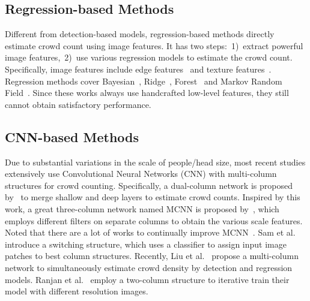 \documentclass[sigconf]{acmart}
\newcommand{\ljx}[1]{\textcolor{black}{#1}}
\begin{document}
\vspace{-2mm}
\subsection{Regression-based Methods}
Different from detection-based models, regression-based methods directly estimate crowd count using image features.
It has two steps:~1)~extract powerful image features,~2)~use various regression models to estimate the crowd count.
Specifically, image features include edge features~\cite{r-edge-count-bayesian-12,r-edege-text-structure-count-12,r-count-edeger-crossing-Line-13,r-edge-count-96,r-density-edge-09} and texture features~\cite{r-count-13,r-edege-text-structure-count-12,r-mrf-count-multi-source-13,r-forest-density-15}. 
Regression methods cover Bayesian~\cite{r-edge-count-bayesian-12}, Ridge~\cite{r-edege-text-structure-count-12}, Forest~\cite{r-forest-density-15} and Markov Random Field~\cite{r-mrf-count-multi-source-13,r-mrf-count-01}.
Since these works always use handcrafted low-level features, they still cannot obtain satisfactory performance.

\vspace{-2mm}
\subsection{CNN-based Methods}
Due to substantial variations in the scale of people/head size, most recent studies extensively use Convolutional Neural Networks (CNN) with multi-column structures for crowd counting.
Specifically, a dual-column network is proposed by~\cite{deep-shallow-deep-crowdnet-16} to merge shallow and deep layers to estimate crowd counts. 
Inspired by this work, a great three-column network named MCNN is proposed by~\cite{MCNN-16}, which employs different filters on separate columns to obtain the various scale features. 
Noted that there are a lot of works to continually improve MCNN~\cite{deep-multi-attention-AFP-18,deep-fscale-multi-task-17,deep-multi-pyramid-cnn-17,deep-multi-cnn-boosting-16}.
Sam et al.~\cite{deep-switch-17} introduce a switching structure, which uses a classifier to assign input image patches to best column structures.
Recently, Liu et al.~\cite{deep-decide-18} propose a \ljx{m}ulti-column network to simultaneously estimate crowd density by detection and regression models.
Ranjan et al.~\cite{deep-training-ICCNN-18} employ a two-column structure to iterative train their model with different resolution images.
\end{document}
